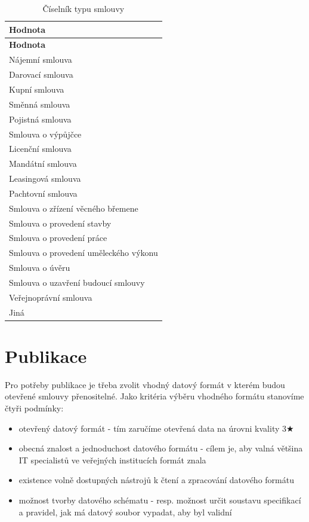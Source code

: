 \begin{center}
\centering
\begin{longtable}[c]{l}
\label{tbl:cisTypsmlouvy} \\
\multicolumn{1}{l}{\textbf{Hodnota}} \\ \hline 
\endfirsthead
\multicolumn{1}{l}{\textbf{Hodnota}} \\ \hline 
\hline
\endhead
\endfoot
\caption{Číselník typu smlouvy}
\endlastfoot
\rowcolor{validateB}Nájemní smlouva \\
\rowcolor{validateB}Darovací smlouva \\
\rowcolor{validateB}Kupní smlouva \\
\rowcolor{validateB}Směnná smlouva \\
\rowcolor{validateB}Pojistná smlouva \\
\rowcolor{validateB}Smlouva o výpůjčce \\
\rowcolor{validateB}Licenční smlouva \\
\rowcolor{validateB}Mandátní smlouva \\
\rowcolor{validateB}Leasingová smlouva \\
\rowcolor{validateB}Pachtovní smlouva \\
\rowcolor{validateB}Smlouva o zřízení věcného břemene \\
\rowcolor{validateB}Smlouva o provedení stavby \\
\rowcolor{validateB}Smlouva o provedení práce \\
\rowcolor{validateB}Smlouva o provedení uměleckého výkonu \\
\rowcolor{validateB}Smlouva o úvěru \\
\rowcolor{validateB}Smlouva o uzavření budoucí smlouvy \\
\rowcolor{validateB}Veřejnoprávní smlouva \\
\rowcolor{validateB}Jiná \\
\end{longtable}
\end{center}

\newpage

\section{Publikace}

Pro potřeby publikace je třeba zvolit vhodný datový formát v kterém budou otevřené smlouvy přenositelné. Jako kritéria výběru vhodného formátu stanovíme čtyři podmínky:

\begin{itemize}
\item otevřený datový formát - tím zaručíme otevřená data na úrovni kvality 3$\bigstar$
\item obecná znalost a jednoduchost datového formátu - cílem je, aby valná většina IT specialistů ve veřejných institucích formát znala
\item existence volně dostupných nástrojů k čtení a zpracování datového formátu
\item možnost tvorby datového schématu - resp. možnost určit soustavu specifikací a pravidel, jak má datový soubor vypadat, aby byl validní
\end{itemize}

